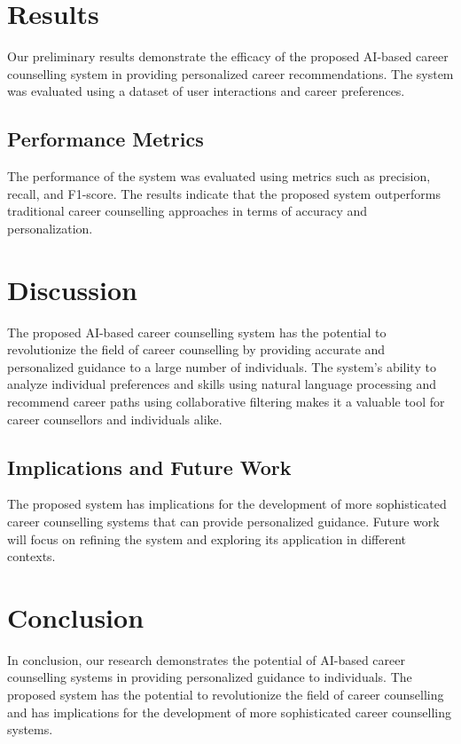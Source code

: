 \documentclass[12pt,a4paper]{article}
\begin{document}
\section{Results}
Our preliminary results demonstrate the efficacy of the proposed AI-based career counselling system in providing personalized career recommendations. The system was evaluated using a dataset of user interactions and career preferences.

\subsection{Performance Metrics}
The performance of the system was evaluated using metrics such as precision, recall, and F1-score. The results indicate that the proposed system outperforms traditional career counselling approaches in terms of accuracy and personalization.

\section{Discussion}
The proposed AI-based career counselling system has the potential to revolutionize the field of career counselling by providing accurate and personalized guidance to a large number of individuals. The system's ability to analyze individual preferences and skills using natural language processing and recommend career paths using collaborative filtering makes it a valuable tool for career counsellors and individuals alike.

\subsection{Implications and Future Work}
The proposed system has implications for the development of more sophisticated career counselling systems that can provide personalized guidance. Future work will focus on refining the system and exploring its application in different contexts.

\section{Conclusion}
In conclusion, our research demonstrates the potential of AI-based career counselling systems in providing personalized guidance to individuals. The proposed system has the potential to revolutionize the field of career counselling and has implications for the development of more sophisticated career counselling systems.
\end{document}

